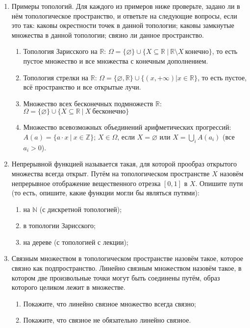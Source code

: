 \documentclass[10pt,a4paper,oneside]{article}
\begin{document}
\begin{enumerate}
\item Примеры топологий.
Для каждого из примеров ниже проверьте, задано ли в нём топологическое пространство, и ответьте на следующие вопросы, если это так:
каковы окрестности точек в данной топологии;
каковы замкнутые множества в данной топологии;
связно ли данное пространство.

\begin{enumerate}
\item Топология Зарисского на $\mathbb{R}$: 
$\Omega = \{\varnothing\} \cup \{ X \subseteq \mathbb{R}\ |\ \mathbb{R} \setminus X\ \text{конечно} \}$,
то есть пустое множество и все множества с конечным дополнением.
\item Топология стрелки на $\mathbb{R}$:
$\Omega = \{\varnothing, \mathbb{R}\} \cup \{ (x,+\infty) | x \in \mathbb{R} \}$, то есть пустое, 
всё пространство и все открытые лучи.
\item Множество всех бесконечных подмножеств $\mathbb{R}$:
$\Omega = \{\varnothing\} \cup \{ X \subseteq \mathbb{R}\ |\ X\ \text{бесконечно} \}$
\item Множество всевозможных объединений арифметических прогрессий:
$A(a) = \{ a\cdot x\ |\ x \in \mathbb{Z}\}$;
$X \in \Omega$, если $X=\varnothing$ или $X = \bigcup_i A(a_i)$ (все $a_i > 0$).
\end{enumerate}

\item Непрерывной функцией называется такая, для которой прообраз открытого множества всегда открыт.
Путём на топологическом пространстве $X$ назовём непрерывное отображение вещественного отрезка $[0,1]$ в $X$.
Опишите пути (то есть, опишите, какие функции могли бы являться путями):
\begin{enumerate}
\item на $\mathbb{N}$ (с дискретной топологией);
\item в топологии Зарисского;
\item на дереве (с топологией с лекции);
\end{enumerate}

\item Связным множеством в топологическом пространстве назовём такое, которое связно как подпространство.
Линейно связным множеством назовём такое, в котором две произвольные точки могут быть соединены путём,
образ которого целиком лежит в множестве. 
\begin{enumerate}
\item Покажите, что линейно связное множество всегда связно;
\item Покажите, что связное не обязательно линейно связное.
\end{enumerate}


\end{enumerate}
\end{document}
